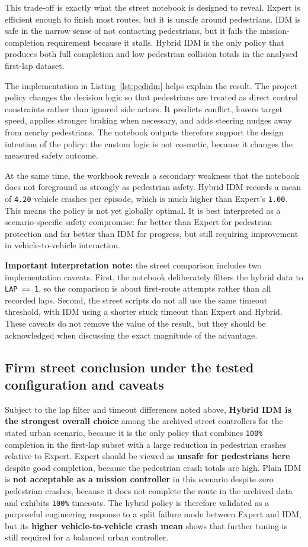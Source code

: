 \documentclass[12pt,a4paper]{report}
\begin{document}
This trade-off is exactly what the street notebook is designed to reveal. Expert is efficient enough to finish most routes, but it is unsafe around pedestrians. IDM is safe in the narrow sense of not contacting pedestrians, but it fails the mission-completion requirement because it stalls. Hybrid IDM is the only policy that produces both full completion and low pedestrian collision totals in the analysed first-lap dataset.

The implementation in Listing~\ref{lst:pedidm} helps explain the result. The project policy changes the decision logic so that pedestrians are treated as direct control constraints rather than ignored side actors. It predicts conflict, lowers target speed, applies stronger braking when necessary, and adds steering nudges away from nearby pedestrians. The notebook outputs therefore support the design intention of the policy: the custom logic is not cosmetic, because it changes the measured safety outcome.

At the same time, the workbook reveals a secondary weakness that the notebook does not foreground as strongly as pedestrian safety. Hybrid IDM records a mean of \texttt{4.20} vehicle crashes per episode, which is much higher than Expert's \texttt{1.00}. This means the policy is not yet globally optimal. It is best interpreted as a scenario-specific safety compromise: far better than Expert for pedestrian protection and far better than IDM for progress, but still requiring improvement in vehicle-to-vehicle interaction.

\noindent\textbf{Important interpretation note:} the street comparison includes two implementation caveats. First, the notebook deliberately filters the hybrid data to \texttt{LAP == 1}, so the comparison is about first-route attempts rather than all recorded laps. Second, the street scripts do not all use the same timeout threshold, with IDM using a shorter stuck timeout than Expert and Hybrid. These caveats do not remove the value of the result, but they should be acknowledged when discussing the exact magnitude of the advantage.

\subsection{Firm street conclusion under the tested configuration and caveats}
Subject to the lap filter and timeout differences noted above, \textbf{Hybrid IDM is the strongest overall choice} among the archived street controllers for the stated urban scenario, because it is the only policy that combines \texttt{100\%} completion in the first-lap subset with a large reduction in pedestrian crashes relative to Expert. Expert should be viewed as \textbf{unsafe for pedestrians here} despite good completion, because the pedestrian crash totals are high. Plain IDM is \textbf{not acceptable as a mission controller} in this scenario despite zero pedestrian crashes, because it does not complete the route in the archived data and exhibits \texttt{100\%} timeouts. The hybrid policy is therefore validated as a purposeful engineering response to a split failure mode between Expert and IDM, but its \textbf{higher vehicle-to-vehicle crash mean} shows that further tuning is still required for a balanced urban controller.
\end{document}
